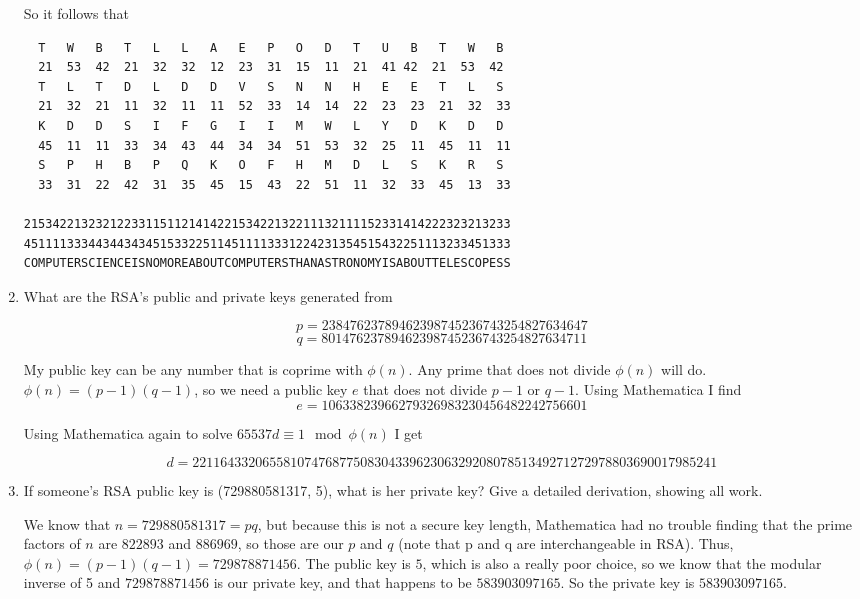 \documentclass[a4paper,12pt]{article}
\begin{document}
\begin{enumerate}
\begin{center}
So it follows that

\begin{verbatim}
  T   W   B   T   L   L   A   E   P   O   D   T   U   B   T   W   B 
  21  53  42  21  32  32  12  23  31  15  11  21  41 42  21  53  42
  T   L   T   D   L   D   D   V   S   N   N   H   E   E   T   L   S
  21  32  21  11  32  11  11  52  33  14  14  22  23  23  21  32  33
  K   D   D   S   I   F   G   I   I   M   W   L   Y   D   K   D   D
  45  11  11  33  34  43  44  34  34  51  53  32  25  11  45  11  11
  S   P   H   B   P   Q   K   O   F   H   M   D   L   S   K   R   S
  33  31  22  42  31  35  45  15  43  22  51  11  32  33  45  13  33

21534221323212233115112141422153422132211132111152331414222323213233
45111133344344343451533225114511113331224231354515432251113233451333
COMPUTERSCIENCEISNOMOREABOUTCOMPUTERSTHANASTRONOMYISABOUTTELESCOPESS
\end{verbatim}
\end{center}

\item What are the RSA's public and private keys generated from

$$p=23847623789462398745236743254827634647$$
$$q=80147623789462398745236743254827634711$$

My public key can be any number that is coprime with $\phi(n)$. Any prime that does not divide $\phi(n)$ will do. $\phi(n) = (p - 1)(q - 1)$, so we need a public key $e$ that does not divide $p - 1$ or $q - 1$. Using Mathematica I find 
$$e = 10633823966279326983230456482242756601$$

Using Mathematica again to solve $65537d \equiv 1 \mod \phi(n)$ I get

$$d = 221164332065581074768775083043396230632920807851349271272978803690017985241$$

\item If someone's RSA public key is (729880581317, 5), what is her private key? Give a detailed derivation, showing all work.

\vspace{5mm}

We know that $n = 729880581317 = pq$, but because this is not a secure key length, Mathematica had no trouble finding that the prime factors of $n$ are $822893$ and $886969$, so those are our $p$ and $q$ (note that p and q are interchangeable in RSA). Thus, $\phi(n) = (p - 1)(q - 1) = 729878871456$. The public key is $5$, which is also a really poor choice, so we know that the modular inverse of 5 and $729878871456$ is our private key, and that happens to be $583903097165$. So the private key is $583903097165$.


\end{enumerate}
\end{document}
